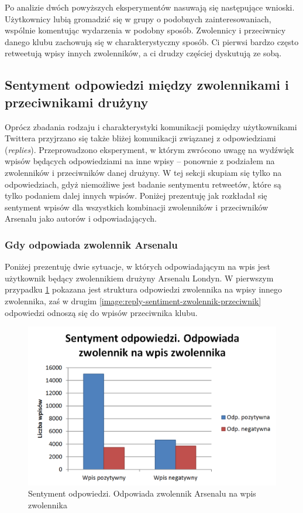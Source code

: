 Po analizie dwóch powyższych eksperymentów nasuwają się następujące wnioski.
Użytkownicy lubią gromadzić się w grupy o podobnych zainteresowaniach,
wspólnie komentując wydarzenia w podobny sposób. Zwolennicy i przeciwnicy
danego klubu zachowują się w charakterystyczny sposób. Ci pierwsi bardzo często
retweetują wpisy innych zwolenników, a ci drudzy częściej dyskutują ze sobą.





\subsection{Sentyment odpowiedzi między zwolennikami i przeciwnikami drużyny}
Oprócz zbadania rodzaju i charakterystyki komunikacji pomiędzy użytkownikami 
Twittera przyjrzano się także bliżej komunikacji związanej z odpowiedziami 
(\textit{replies}). Przeprowadzono eksperyment, w którym zwrócono uwagę
na wydźwięk wpisów będących odpowiedziami na inne wpisy -- ponownie z podziałem
na zwolenników i przeciwników danej drużyny. W tej sekcji skupiam się tylko na
odpowiedziach, gdyż niemożliwe jest badanie sentymentu retweetów, które są
tylko podaniem dalej innych wpisów. Poniżej prezentuję jak rozkładał się
sentyment wpisów dla wszystkich kombinacji zwolenników i przeciwników
Arsenalu jako autorów i odpowiadających.


\subsubsection{Gdy odpowiada zwolennik Arsenalu}
Poniżej prezentuję dwie sytuacje, w których odpowiadającym na wpis jest
użytkownik będący zwolennikiem drużyny Arsenalu Londyn. W pierwszym przypadku
\ref{image:reply-sentiment-zwolennik-zwolennik} pokazana jest struktura
odpowiedzi zwolennika na wpisy innego zwolennika, zaś w drugim
\ref{image:reply-sentiment-zwolennik-przeciwnik} odpowiedzi odnoszą się do
wpisów przeciwnika klubu.

\begin{figure}[ht!]
\centering
\includegraphics[width=120mm]{img/reply-sentiment-zwolennik-zwolennik.png}
\caption{Sentyment odpowiedzi. Odpowiada zwolennik Arsenalu na wpis zwolennika}
\label{image:reply-sentiment-zwolennik-zwolennik}
\end{figure}


